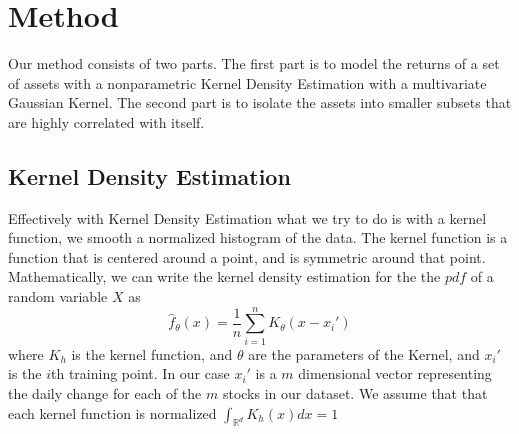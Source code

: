 \documentclass[10pt]{article}
\begin{document}
\section{Method}
Our method consists of two parts. The first part is to model the returns of a set of assets with a nonparametric Kernel Density Estimation with 
a multivariate Gaussian Kernel. The second part is to isolate the assets into smaller subsets that are highly correlated with itself.
\subsection{Kernel Density Estimation}
Effectively with Kernel Density Estimation what we try to do is with a kernel function, we 
smooth a normalized histogram of the data. The kernel function is a function that is centered around a point, and is symmetric around that point.
Mathematically, we can write the kernel density estimation for the the $pdf$ of a random variable $X$ as
\begin{equation}
\hat{f}_{\theta}(x) = \frac{1}{n} \sum_{i=1}^n K_{\theta}(x-x_i')
\end{equation}
where $K_h$ is the kernel function, and $\theta$ are the parameters of the Kernel, and $x_i'$ is the $i$th training point. 
In our case $x_i'$ is a $m$ dimensional vector representing the daily change for each of the $m$ stocks in our dataset.
We assume that that each kernel function is normalized $\int_{\mathbb{R}^d} K_h(x) dx = 1$
\end{document}
